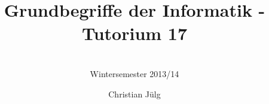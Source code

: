 ﻿%

\title[GBI Tutorium 17]{Grundbegriffe der Informatik - Tutorium 17}%
\subtitle{
\insertauthor 
\\
Wintersemester 2013/14
\\
\insertdate 
}
\author[\hspace{2em}Christian Jülg]{Christian Jülg}
